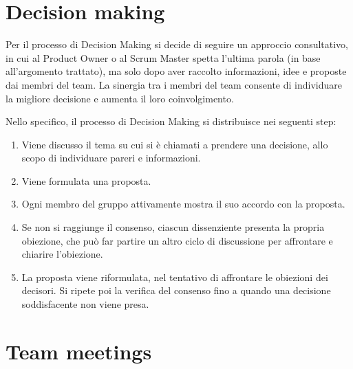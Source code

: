 \documentclass{article}
\begin{document}
\section{Decision making}
Per il processo di Decision Making si decide di seguire un approccio consultativo, in cui al
Product Owner o al Scrum Master spetta l'ultima parola (in base all'argomento trattato), 
ma solo dopo aver raccolto informazioni, idee e proposte dai membri del team. 
La sinergia tra i membri del team consente di individuare la migliore decisione e aumenta il 
loro coinvolgimento.

Nello specifico, il processo di Decision Making si distribuisce nei seguenti step:
\begin{enumerate}
    \item Viene discusso il tema su cui si è chiamati a prendere una decisione,
    allo scopo di individuare pareri e informazioni.
    \item Viene formulata una proposta.
    \item Ogni membro del gruppo attivamente mostra il suo accordo con la proposta.
    \item Se non si raggiunge il consenso, ciascun dissenziente presenta 
    la propria obiezione, che può far partire un altro ciclo di discussione per affrontare
    e chiarire l'obiezione.
    \item La proposta viene riformulata, nel tentativo di affrontare le obiezioni dei decisori. 
    Si ripete poi la verifica del consenso fino a quando una decisione soddisfacente non viene presa.
\end{enumerate}

\section{Team meetings}
\end{document}
